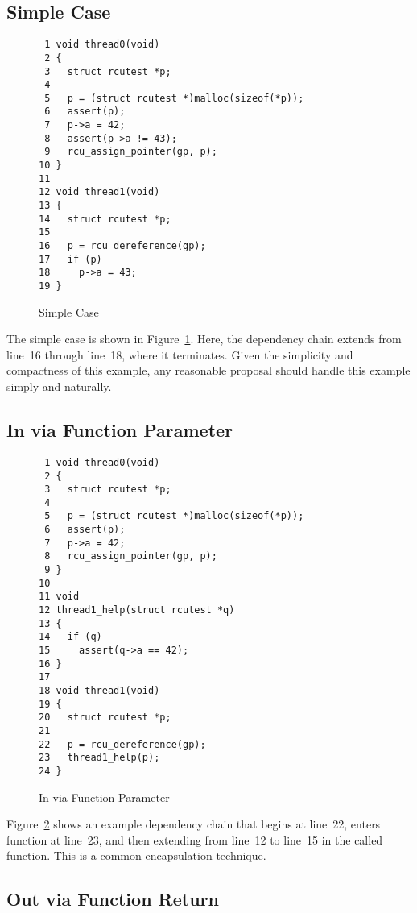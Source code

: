 \documentclass[letterpaper,twocolumn,10pt]{article}
\begin{document}
\subsection{Simple Case}
\label{sec:Simple Case}

\begin{figure}[tbp]
{ \scriptsize
\begin{verbatim}
 1 void thread0(void)
 2 {
 3   struct rcutest *p;
 4
 5   p = (struct rcutest *)malloc(sizeof(*p));
 6   assert(p);
 7   p->a = 42;
 8   assert(p->a != 43);
 9   rcu_assign_pointer(gp, p);
10 }
11
12 void thread1(void)
13 {
14   struct rcutest *p;
15
16   p = rcu_dereference(gp);
17   if (p)
18     p->a = 43;
19 }
\end{verbatim}
}
\caption{Simple Case}
\label{fig:Simple Case}
\end{figure}

The simple case is shown in
Figure~\ref{fig:Simple Case}.
Here, the dependency chain extends from line~16 through line~18,
where it terminates.
Given the simplicity and compactness of this example, any reasonable
proposal should handle this example simply and naturally.

\subsection{In via Function Parameter}
\label{sec:In via Function Parameter}

\begin{figure}[tbp]
{ \scriptsize
\begin{verbatim}
 1 void thread0(void)
 2 {
 3   struct rcutest *p;
 4
 5   p = (struct rcutest *)malloc(sizeof(*p));
 6   assert(p);
 7   p->a = 42;
 8   rcu_assign_pointer(gp, p);
 9 }
10
11 void
12 thread1_help(struct rcutest *q)
13 {
14   if (q)
15     assert(q->a == 42);
16 }
17
18 void thread1(void)
19 {
20   struct rcutest *p;
21
22   p = rcu_dereference(gp);
23   thread1_help(p);
24 }
\end{verbatim}
}
\caption{In via Function Parameter}
\label{fig:In via Function Parameter}
\end{figure}

Figure~\ref{fig:In via Function Parameter}
shows an example dependency chain that begins at line~22,
enters function  at line~23,
and then extending from line~12 to line~15 in the called function.
This is a common encapsulation technique.

\subsection{Out via Function Return}
\label{sec:Out via Function Return}
\end{document}
